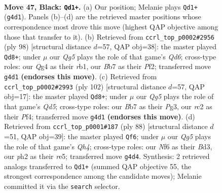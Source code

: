 \documentclass[11pt]{article}
\begin{document}
\clearpage

\begin{figure}[p]\centering
\begin{subfigure}{0.46\textwidth}\centering
\resizebox{\linewidth}{!}{%
\newchessgame
\chessboard[
  setfen={6k1/1b3p2/5np1/8/6qP/6N1/1RR4P/6K1 b - - 2 47},
  showmover=false,
  pgfstyle=straightmove, color=movearrow, markmove={g4-d1}
]}
\caption{}
\end{subfigure}\hfill
\begin{subfigure}{0.46\textwidth}\centering
\resizebox{\linewidth}{!}{%
\newchessgame
\chessboard[
  setfen={6k1/5pp1/2bQ4/2Pn4/8/7P/1p3P2/1r3NK1 w - - 0 50},
  showmover=false,
  pgfstyle=straightmove, color=movearrow, markmove={d6-d8}
]}
\caption{}
\end{subfigure}
\\[4pt]
\begin{subfigure}{0.46\textwidth}\centering
\resizebox{\linewidth}{!}{%
\newchessgame
\chessboard[
  setfen={6k1/1p3p2/2r4p/3Q3P/5P2/6P1/2p3K1/8 w - - 1 52},
  showmover=false,
  pgfstyle=straightmove, color=movearrow, markmove={d5-d8}
]}
\caption{}
\end{subfigure}\hfill
\begin{subfigure}{0.46\textwidth}\centering
\resizebox{\linewidth}{!}{%
\newchessgame
\chessboard[
  setfen={3k4/2p1r3/2p5/4r2p/7Q/3B2P1/5K2/8 w - - 0 45},
  showmover=false,
  pgfstyle=straightmove, color=movearrow, markmove={h4-f6}
]}
\caption{}
\end{subfigure}
\caption{\textbf{Move 47, Black: \texttt{Qd1+}.} (a) Our position; Melanie plays \texttt{Qd1+} (\texttt{g4d1}). Panels (b)--(d) are the retrieved master positions whose correspondence most drove this move (highest QAP objective among those that transfer to it). (b) Retrieved from \texttt{ccrl\_top\_p0002\#2956} (ply 98) [structural distance $d$=57, QAP obj=38]: the master played \texttt{Qd8+}; under $\mu$ our \emph{Qg5} plays the role of that game's \emph{Qd6}; cross-type roles: our \emph{Q}g4 as their \emph{r}b1, our \emph{B}b7 as their \emph{P}f2; transferred move \texttt{g4d1} \textbf{(endorses this move)}. (c) Retrieved from \texttt{ccrl\_top\_p0002\#2993} (ply 102) [structural distance $d$=57, QAP obj=17]: the master played \texttt{Qd8+}; under $\mu$ our \emph{Qg5} plays the role of that game's \emph{Qd5}; cross-type roles: our \emph{B}b7 as their \emph{P}g3, our \emph{r}c2 as their \emph{P}f4; transferred move \texttt{g4d1} \textbf{(endorses this move)}. (d) Retrieved from \texttt{ccrl\_top\_p0001\#187} (ply 88) [structural distance $d$=51, QAP obj=39]: the master played \texttt{Qf6}; under $\mu$ our \emph{Qg5} plays the role of that game's \emph{Qh4}; cross-type roles: our \emph{N}f6 as their \emph{B}d3, our \emph{p}h2 as their \emph{r}e5; transferred move \texttt{g4d4}. Synthesis: 2 retrieved analogs transferred to \texttt{Qd1+} (summed QAP objective 55, the strongest correspondence among the candidate moves); Melanie committed it via the \texttt{search} selector.}
\label{fig:thought-m93}
\end{figure}
\end{document}
